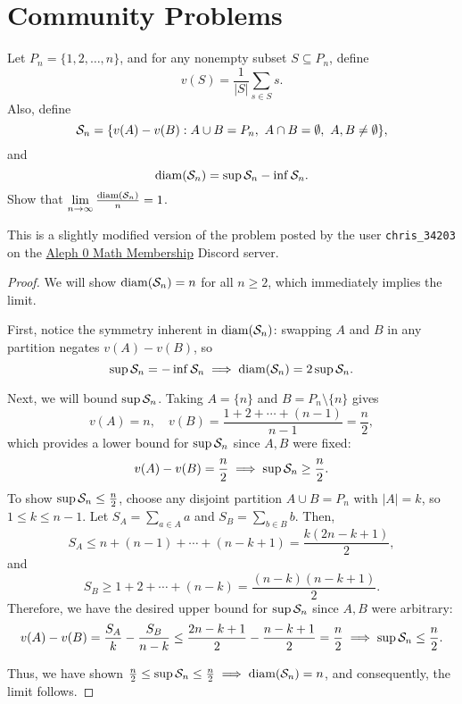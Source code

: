 \section{Community Problems}

\begin{problem}
  Let $P_{n} = \{ 1, 2, \dots, n \}$, and for any nonempty subset $S \subseteq P_{n}$, define
  \[
    v(S) = \dfrac{1}{|S|} \sum_{s \in S} s. 
  \]
  Also, define 
  \[
    \mathcal{S}_{n} = \{ v(A) - v(B) : A \cup B = P_n,\ A \cap B = \emptyset,\ A, B \neq \emptyset \},
  \]
  and 
  \[
    \operatorname{diam}(\mathcal{S}_{n}) = \sup \mathcal{S}_{n} - \inf \mathcal{S}_{n}.
  \]
  Show that $\lim\limits_{n \to \infty} \frac{\operatorname{diam}(\mathcal{S}_{n})}{n} = 1$.

  \begin{callout}
    This is a slightly modified version of the problem posted by the user \texttt{chris\_34203}
    on the \href{https://discord.com/channels/1381996954237800608/1381996954673745932/1393174128432906357}{Aleph 0 Math Membership} Discord server.
  \end{callout}

\end{problem}

\begin{proof}
  We will show $\operatorname{diam}(\mathcal{S}_{n}) = n$ for all $n \ge 2$, which immediately implies the limit.

  First, notice the symmetry inherent in $\operatorname{diam}(\mathcal{S}_{n})$: swapping $A$ and $B$ in any partition negates $v(A)-v(B)$, so
  \[
    \sup \mathcal{S}_{n} = -\inf \mathcal{S}_{n} \implies \operatorname{diam}(\mathcal{S}_{n}) = 2\sup \mathcal{S}_{n}.
  \]

  Next, we will bound $\sup \mathcal{S}_{n}$. Taking $A = \{ n \}$ and $B = P_n \setminus \{ n \}$ gives
  \[
    v(A) = n, \quad v(B) = \frac{1 + 2 + \cdots + (n-1)}{n - 1} = \frac{n}{2},
  \]
  which provides a lower bound for $\sup \mathcal{S}_{n}$ since $A, B$ were fixed:
  \[
    v(A) - v(B) = \frac{n}{2} \implies \sup \mathcal{S}_{n} \ge \frac{n}{2}.
  \]
  To show $\sup \mathcal{S}_{n} \le \frac{n}{2}$, choose any disjoint partition $A \cup B = P_{n}$ with $|A| = k$, so $1 \le k \le n - 1$.
  Let $S_A = \sum\limits_{a \in A} a$ and $S_B = \sum\limits_{b \in B} b$. Then,
  \[
    S_{A} \le n + (n-1) + \cdots + (n - k + 1) = \frac{k(2n - k + 1)}{2},
  \]
  and
  \[
    S_{B} \ge 1 + 2 + \cdots + (n - k) = \frac{(n - k)(n - k + 1)}{2}.
  \]
  Therefore, we have the desired upper bound for $\sup \mathcal{S}_{n}$ since $A, B$ were arbitrary:
  \[
    v(A) - v(B) = \frac{S_A}{k} - \frac{S_B}{n - k} \le \frac{2n - k + 1}{2} - \frac{n - k + 1}{2} = \frac{n}{2} \implies \sup \mathcal{S}_{n} \le \frac{n}{2}.
  \]

  Thus, we have shown $\frac{n}{2} \leq \sup \mathcal{S}_{n} \leq \frac{n}{2} \implies \operatorname{diam}(\mathcal{S}_{n}) = n$, and consequently,
  the limit follows.
\end{proof}
